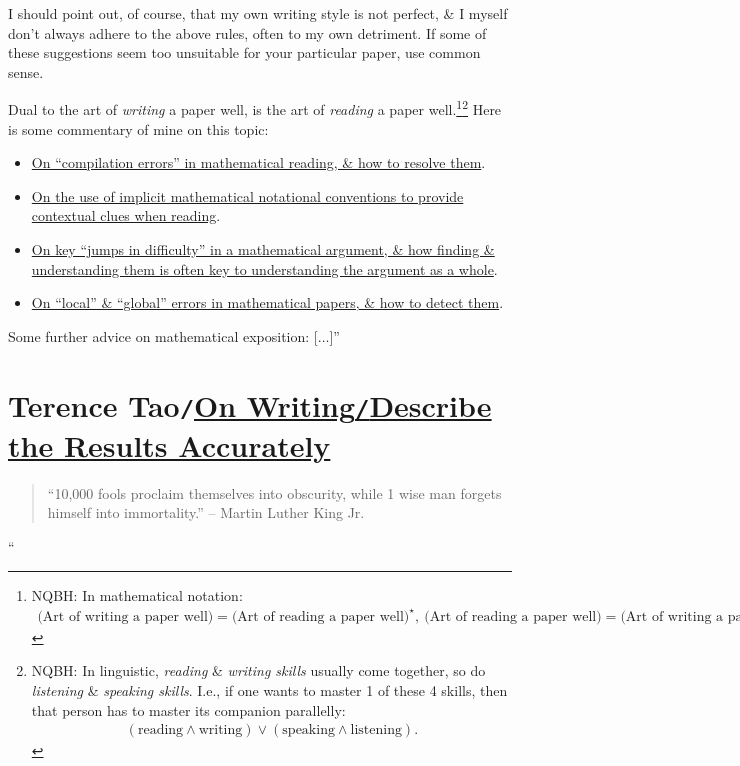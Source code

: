\documentclass[oneside]{book}
\numberwithin{equation}{section}
\begin{document}
I should point out, of course, that my own writing style is not perfect, \& I myself don't always adhere to the above rules, often to my own detriment. If some of these suggestions seem too unsuitable for your particular paper, use common sense.

Dual to the art of \textit{writing} a paper well, is the art of \textit{reading} a paper well.\footnote{NQBH: In mathematical notation: \begin{align*}
		\mbox{(Art of writing a paper well)} = \mbox{(Art of reading a paper well)}^\star,\ \mbox{(Art of reading a paper well)} = \mbox{(Art of writing a paper well)}^\star.
\end{align*}}\footnote{NQBH: In linguistic, \textit{reading} \& \textit{writing skills} usually come together, so do \textit{listening} \& \textit{speaking skills}. I.e., if one wants to master 1 of these 4 skills, then that person has to master its companion parallelly:
\begin{align*}
	(\mbox{reading}\land\mbox{writing})\lor(\mbox{speaking}\land\mbox{listening}).
\end{align*}} Here is some commentary of mine on this topic:
\begin{itemize}
	\item \href{https://terrytao.wordpress.com/advice-on-writing-papers/on-compilation-errors-in-mathematical-reading-and-how-to-resolve-them/}{On ``compilation errors'' in mathematical reading, \& how to resolve them}.
	\item \href{https://terrytao.wordpress.com/advice-on-writing-papers/implicit-notational-conventions/}{On the use of implicit mathematical notational conventions to provide contextual clues when reading}.
	\item \href{https://terrytao.wordpress.com/advice-on-writing-papers/on-the-strength-of-theorems/}{On key ``jumps in difficulty'' in a mathematical argument, \& how finding \& understanding them is often key to understanding the argument as a whole}.
	\item \href{https://terrytao.wordpress.com/advice-on-writing-papers/on-local-and-global-errors-in-mathematical-papers-and-how-to-detect-them/}{On ``local'' \& ``global'' errors in mathematical papers, \& how to detect them}.
\end{itemize}
Some further advice on mathematical exposition: [$\ldots$]''

\section{Terence Tao\texttt{/}\href{https://terrytao.wordpress.com/advice-on-writing-papers/describe-the-results-accurately/}{On Writing\texttt{/}Describe the Results Accurately}}
\begin{quotation}
	``10,000 fools proclaim themselves into obscurity, while 1 wise man forgets himself into immortality.'' -- Martin Luther King Jr.
\end{quotation}
``
\end{document}
